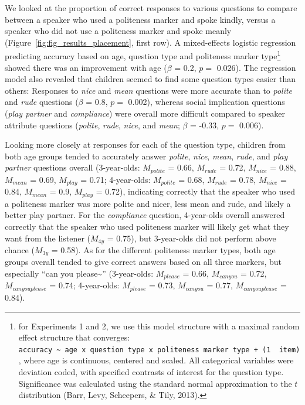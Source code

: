 \documentclass[10pt, letterpaper]{article}
\begin{document}
We looked at the proportion of correct responses to various questions to
compare between a speaker who used a politeness marker and spoke kindly,
versus a speaker who did not use a politeness marker and spoke meanly
(Figure~\ref{fig:fig_results_placement}, first row). A mixed-effects
logistic regression predicting accuracy based on age, question type and
politeness marker type\footnote{for Experiments 1 and 2, we use this
  model structure with a maximal random effect structure that converges:
  \texttt{accuracy\ \textasciitilde{}\ age\ x\ question\ type\ x\ politeness\ marker\ type\ +\ (1\ \textbar{}\ item)},
  where age is continuous, centered and scaled. All categorical
  variables were deviation coded, with specified contrasts of interest
  for the question type. Significance was calculated using the standard
  normal approximation to the \(t\) distribution (Barr, Levy, Scheepers,
  \& Tily, 2013).} showed there was an improvement with age (\(\beta\) =
0.2, \(p =\) 0.026). The regression model also revealed that children
seemed to find some question types easier than others: Responses to
\emph{nice} and \emph{mean} questions were more accurate than to
\emph{polite} and \emph{rude} questions (\(\beta\) = 0.8, \(p =\)
0.002), whereas social implication questions (\emph{play partner} and
\emph{compliance}) were overall more difficult compared to speaker
attribute questions (\emph{polite}, \emph{rude}, \emph{nice}, and
\emph{mean}; \(\beta\) = -0.33, \(p =\) 0.006).

Looking more closely at responses for each of the question type,
children from both age groups tended to accurately answer \emph{polite},
\emph{nice}, \emph{mean}, \emph{rude}, and \emph{play partner} questions
overall (3-year-olds: \(M_{polite}\) = 0.66, \(M_{rude}\) = 0.72,
\(M_{nice}\) = 0.88, \(M_{mean}\) = 0.69, \(M_{play}\) = 0.71;
4-year-olds: \(M_{polite}\) = 0.68, \(M_{rude}\) = 0.78, \(M_{nice}\) =
0.84, \(M_{mean}\) = 0.9, \(M_{play}\) = 0.72), indicating correctly
that the speaker who used a politeness marker was more polite and nicer,
less mean and rude, and likely a better play partner. For the
\emph{compliance} question, 4-year-olds overall answered correctly that
the speaker who used politeness marker will likely get what they want
from the listener (\(M_{4y}\) = 0.75), but 3-year-olds did not perform
above chance (\(M_{3y}\) = 0.58). As for the different politeness marker
types, both age groups overall tended to give correct answers based on
all three markers, but especially ``can you please\textasciitilde{}''
(3-year-olds: \(M_{please}\) = 0.66, \(M_{can you}\) = 0.72,
\(M_{can you please}\) = 0.74; 4-year-olds: \(M_{please}\) = 0.73,
\(M_{can you}\) = 0.77, \(M_{can you please}\) = 0.84).
\end{document}
